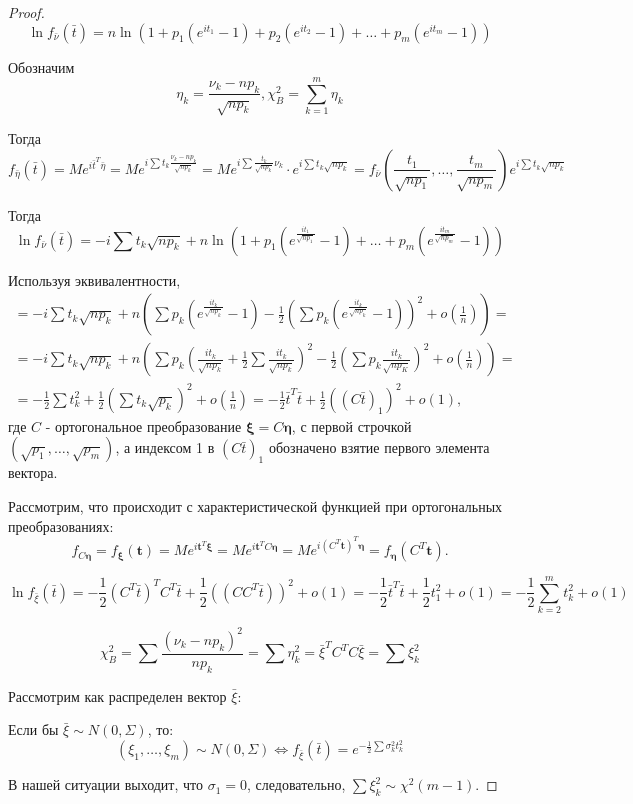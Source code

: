 \begin{proof}
  \[
    \ln f_{\bar \nu} (\bar t) = n \ln (1 + p_1 (e^{i t_1} - 1) + p_2 (e^{i t_2} - 1) + \dots + p_m (e^{i t_m} - 1))
  \]

  Обозначим
  \[
    \eta_k = \frac{\nu_k - np_k}{\sqrt{np_k}}, \chi^2_B = \sum_{k=1}^m \eta_k
  \]

  Тогда
  \[
    f_{\bar \eta} (\bar t) = M e^{i \bar t^T \bar \eta} =
    M e^{i \sum t_k \frac{\nu_k - np_k}{\sqrt{np_k}}} = 
    M e^{i \sum \frac{t_k}{\sqrt{np_k}} \nu_k} \cdot e^{i \sum t_k \sqrt{np_k}} = 
    f_{\bar \nu} (\frac{t_1}{\sqrt{np_1}}, \dots, \frac{t_m}{\sqrt{np_m}}) e^{i \sum t_k \sqrt{np_k}}
  \]

  Тогда
  \[
    \ln f_{\bar \nu} (\bar t) = -i \sum t_k \sqrt{np_k} + n \ln (1+p_1 (e^{\frac{i t_1}{\sqrt{np_1}}} - 1)+ \dots + p_m (e^{\frac{i t_m}{\sqrt{np_m}}} - 1) )
  \]

  Используя эквивалентности,
  \begin{multline*}
    = -i \sum t_k \sqrt{np_k} + n \left( \sum p_k \left(e^{\frac{i t_k}{\sqrt{np_k}}}
    - 1\right) - \frac{1}{2} \left(\sum p_k(e^{\frac{i t_k}{\sqrt{np_k}}} - 1)\right)^2 +
  o\left(\frac{1}{n}\right) \right) = \\
    = -i \sum t_k \sqrt{np_k} + n \left( \sum p_k \left(\frac{i t_k}{\sqrt{np_k}} +
    \frac{1}{2} \sum \frac{i t_k}{\sqrt{np_k}}\right)^2 - \frac{1}{2} \left(\sum p_k
  \frac{i t_k}{\sqrt{np_K}}\right)^2 + o\left(\frac{1}{n}\right) \right) = \\
    = - \frac{1}{2} \sum t_k^2 + \frac{1}{2} \left( \sum t_k \sqrt{p_k}
    \right)^2 + o\left(\frac{1}{n}\right)
    = - \frac{1}{2} \bar t^T \bar t + \frac{1}{2} ((C \bar t)_1)^2 + o(1),
  \end{multline*}
  где $C$ - ортогональное преобразование $\bm \xi = C \bm\eta$, с первой
  строчкой $(\sqrt{p_1}, \dots, \sqrt{p_m})$,
    а индексом 1 в $(C \bar t)_1$ обозначено взятие первого элемента вектора.

  Рассмотрим, что происходит с характеристической функцией при ортогональных преобразованиях:
  \[
    f_{C\bm\eta} = f_{\bm \xi} (\mathbf t) = M e^{i \mathbf t^T \bm \xi} = M e^{i \mathbf t^T C
    \bm\eta} =
    M e^{i (C^T \mathbf t)^T \bm \eta} = f_{\bm\eta} (C^T \mathbf t).
  \]

  \[
    \ln f_{\bar \xi} (\bar t) = - \frac{1}{2} (C^T \bar t)^T C^T \bar t + \frac{1}{2} ((C C^T \bar t))^2 + o(1) = -\frac{1}{2} \bar t^T \bar t + \frac{1}{2} t_1^2 + o(1) = - \frac{1}{2} \sum_{k=2}^m t_k^2 + o(1)
  \]

  \[
    \chi^2_B = \sum \frac{(\nu_k - np_k)^2}{np_k} = \sum \eta_k^2 = \bar \xi^T C^T C \bar \xi = \sum \xi_k^2
  \]

  Рассмотрим как распределен вектор $\bar \xi$:
  
  Если бы $\bar \xi \sim N(0, \Sigma)$, то:
  \[
    (\xi_1, \dots, \xi_m) \sim N(0, \Sigma) \Leftrightarrow f_{\bar \xi} (\bar t) = e^{-\frac{1}{2} \sum \sigma_k^2 t_k^2}
  \]

  В нашей ситуации выходит, что $\sigma_1 = 0$, следовательно, $\sum \xi_k^2 \sim \chi^2 (m-1)$.
\end{proof}

